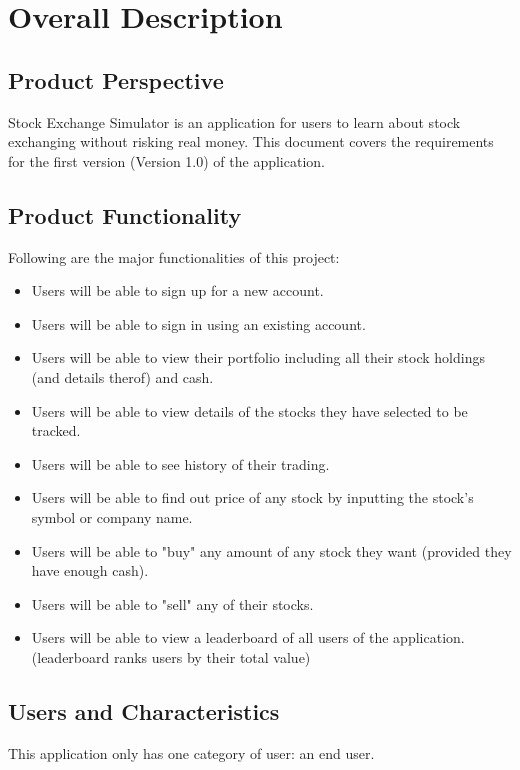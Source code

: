 \documentclass[12 pt, a4paper]{report}
\begin{document}
	\chapter {Overall Description}
	\section {Product Perspective}

	Stock Exchange Simulator is an application for users to learn about stock exchanging without risking real money. This document covers the requirements for the first version (Version 1.0) of the application.
	
	\section {Product Functionality} 

	Following are the major functionalities of this project:
	\begin{itemize}
		\item Users will be able to sign up for a new account.
		\item Users will be able to sign in using an existing account.
		\item Users will be able to view their portfolio including all their stock holdings (and details therof) and cash.
		\item Users will be able to view details of the stocks they have selected to be tracked.
		\item Users will be able to see history of their trading.
		\item Users will be able to find out price of any stock by inputting the stock's symbol or company name.
		\item Users will be able to "buy" any amount of any stock they want (provided they have enough cash).
		\item Users will be able to "sell" any of their stocks.
		\item Users will be able to view a leaderboard of all users of the application. (leaderboard ranks users by their total value)
	\end{itemize}
	
	\section {Users and Characteristics}
	
	This application only has one category of user: an end user.
	
\end{document}
